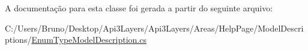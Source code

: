 A documentação para esta classe foi gerada a partir do seguinte arquivo\+:\begin{DoxyCompactItemize}
\item 
C\+:/\+Users/\+Bruno/\+Desktop/\+Api3\+Layers/\+Api3\+Layers/\+Areas/\+Help\+Page/\+Model\+Descriptions/\hyperlink{EnumTypeModelDescription_8cs}{Enum\+Type\+Model\+Description.\+cs}\end{DoxyCompactItemize}
